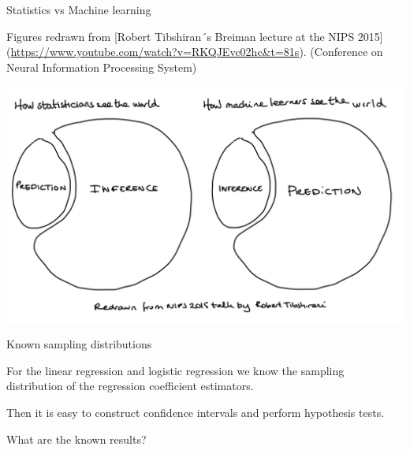 \documentclass[
  ignorenonframetext,
]{beamer}
\begin{document}
\begin{frame}

\begin{block}{Statistics vs Machine learning}

Figures redrawn from {[}Robert Tibshiran´s Breiman lecture at the NIPS
2015{]} (\url{https://www.youtube.com/watch?v=RKQJEvc02hc\&t=81s}).
(Conference on Neural Information Processing System)

\includegraphics[width=0.7\linewidth]{./StatsvsMLPredInf}

\end{block}

\end{frame}

\begin{frame}

\begin{block}{Known sampling distributions}

For the linear regression and logistic regression we know the sampling
distribution of the regression coefficient estimators.

Then it is easy to construct confidence intervals and perform hypothesis
tests.

What are the known results?

\end{block}

\end{frame}

\begin{frame}

\end{frame}
\end{document}
